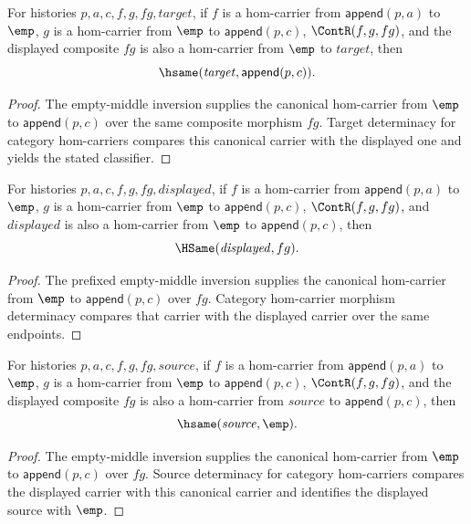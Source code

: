 \begin{theorem}
\label{thm:functor-prefix-hom-carrier-comp-empty-middle-target-deterministic}
For histories $p,a,c,f,g,fg,\mathit{target}$, if $f$ is a hom-carrier from
$\mathsf{append}(p,a)$ to $\emp$, $g$ is a hom-carrier from $\emp$ to
$\mathsf{append}(p,c)$, $\ContR(f,g,fg)$, and the displayed composite
$fg$ is also a hom-carrier from $\emp$ to $\mathit{target}$, then
$$
\hsame(\mathit{target},\mathsf{append}(p,c)).
$$
\end{theorem}
\begin{proof}
The empty-middle inversion supplies the canonical hom-carrier from $\emp$ to
$\mathsf{append}(p,c)$ over the same composite morphism $fg$. Target
determinacy for category hom-carriers compares this canonical carrier with the
displayed one and yields the stated classifier.
\end{proof}

\begin{theorem}
\label{thm:functor-prefix-hom-carrier-comp-empty-middle-displayed-morphism-deterministic}
For histories $p,a,c,f,g,fg,\mathit{displayed}$, if $f$ is a hom-carrier from
$\mathsf{append}(p,a)$ to $\emp$, $g$ is a hom-carrier from $\emp$ to
$\mathsf{append}(p,c)$, $\ContR(f,g,fg)$, and $\mathit{displayed}$ is also a
hom-carrier from $\emp$ to $\mathsf{append}(p,c)$, then
$$
\HSame(\mathit{displayed},fg).
$$
\end{theorem}
\begin{proof}
The prefixed empty-middle inversion supplies the canonical hom-carrier from
$\emp$ to $\mathsf{append}(p,c)$ over $fg$. Category hom-carrier morphism
determinacy compares that carrier with the displayed carrier over the same
endpoints.
\end{proof}

\begin{theorem}
\label{thm:functor-prefix-hom-carrier-comp-empty-middle-source-deterministic}
For histories $p,a,c,f,g,fg,\mathit{source}$, if $f$ is a hom-carrier from
$\mathsf{append}(p,a)$ to $\emp$, $g$ is a hom-carrier from $\emp$ to
$\mathsf{append}(p,c)$, $\ContR(f,g,fg)$, and the displayed composite $fg$ is
also a hom-carrier from $\mathit{source}$ to $\mathsf{append}(p,c)$, then
$$
\hsame(\mathit{source},\emp).
$$
\end{theorem}
\begin{proof}
The empty-middle inversion supplies the canonical hom-carrier from $\emp$ to
$\mathsf{append}(p,c)$ over $fg$. Source determinacy for category hom-carriers
compares the displayed carrier with this canonical carrier and identifies the
displayed source with $\emp$.
\end{proof}

